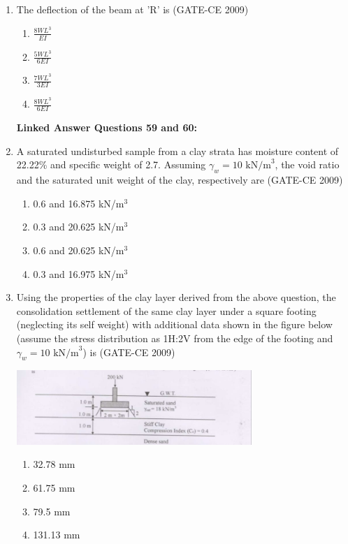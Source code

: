 \documentclass[12pt]{article}
\begin{document}
\begin{enumerate}[label=Q.\arabic*]
    \item The deflection of the beam at 'R' is (GATE-CE 2009)
    \begin{enumerate}[label=(\Alph*)]
        \item $\frac{8WL^3}{EI}$ 
        \item $\frac{5WL^3}{6EI}$ 
        \item $\frac{7WL^3}{3EI}$ 
        \item $\frac{8WL^3}{6EI}$
    \end{enumerate}
    
\textbf{Linked Answer Questions 59 and 60:}
    \item A saturated undisturbed sample from a clay strata has moisture content of 22.22\% and specific weight of 2.7. Assuming $\gamma_w = 10 \text{ kN/m}^3$, the void ratio and the saturated unit weight of the clay, respectively are (GATE-CE 2009)
    \begin{enumerate}[label=(\Alph*)]
        \item 0.6 and 16.875 kN/m$^3$ 
        \item 0.3 and 20.625 kN/m$^3$ 
        \item 0.6 and 20.625 kN/m$^3$ 
        \item 0.3 and 16.975 kN/m$^3$
    \end{enumerate}
    
    \item Using the properties of the clay layer derived from the above question, the consolidation settlement of the same clay layer under a square footing (neglecting its self weight) with additional data shown in the figure below (assume the stress distribution as 1H:2V from the edge of the footing and $\gamma_w = 10 \text{ kN/m}^3$) is (GATE-CE 2009)
    \begin{center}
    \includegraphics[width=0.7\textwidth]{image7.jpg}
    \end{center}
    \begin{enumerate}[label=(\Alph*)]
        \item 32.78 mm 
        \item 61.75 mm 
        \item 79.5 mm 
        \item 131.13 mm
    \end{enumerate}
\end{enumerate}
\end{document}

